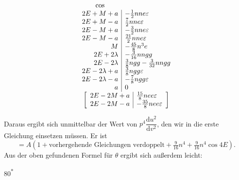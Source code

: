 \[
\begin{array}{r|l}
\multicolumn{1}{c}{\cos}&\\
2E+M+a&-\tfrac12nne\varepsilon\\
2E+M-a&\tfrac72nne\varepsilon\\
2E-M+a&-\tfrac32nne\varepsilon\\
2E-M-a&\tfrac{21}{2}nne\varepsilon\\
M&-\tfrac{45}{8}n^3e\\
2E+2\lambda&-\tfrac{3}{16}nngg\\
2E-2\lambda&\tfrac38ngg-\tfrac{3}{32}nngg\\
2E-2\lambda+a&\tfrac38ngg\varepsilon\\
2E-2\lambda-a&-\tfrac78ngg\varepsilon\\
a&0\\
\multicolumn{2}{c}{\left[\begin{array}{r|l}
2E-2M+a&\tfrac{15}{8}nee\varepsilon\\
2E-2M-a&-\tfrac{35}{8}nee\varepsilon
\end{array}\right]}
\end{array}
\]
\par\noindent\hspace*{\parindent}Daraus ergibt sich unmittelbar der Wert von \(p^4\dfrac{\mathrm du^2}{\mathrm dv^2}\), den wir in die erste
Gleichung einsetzen müssen. Er ist
\[
=A(1+\text{vorhergehende Gleichungen verdoppelt}+\tfrac{9}{16}n^4+\tfrac{9}{16}n^4\cos4E).
\]
\noindent Aus der oben gefundenen Formel für \(\theta\) ergibt sich außerdem leicht:\par
\nopagebreak
\vfill
\noindent\hfill80\textsuperscript{*}\par
\clearpage
\endgroup
